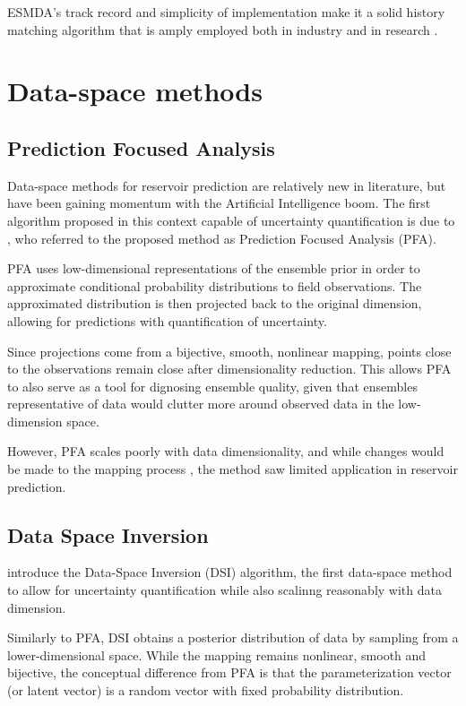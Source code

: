 ESMDA's track record and simplicity of implementation make it
a solid history matching algorithm that is 
amply employed both in industry and in research
\cite{Grana:2019, Neto:2021, Tao:2025}.

\section{Data-space methods}
\label{sec:data-space-methods} 

\subsection{Prediction Focused Analysis}
    Data-space methods for reservoir prediction are relatively new in literature, 
    but have been gaining momentum with the Artificial Intelligence boom.
    The first algorithm proposed in this context capable of uncertainty quantification
    is due to ,
    who referred to the proposed method as Prediction Focused Analysis (PFA).
    
    PFA uses low-dimensional representations of the ensemble prior in order to 
    approximate conditional probability distributions to field observations.
    The approximated distribution is then projected back to the original dimension, 
    allowing for predictions with quantification of uncertainty.
    
    Since projections come from a bijective, smooth, nonlinear mapping, 
    points close to the observations remain close after dimensionality reduction.
    This allows PFA to also serve as a tool for dignosing ensemble quality, 
    given that ensembles representative of data would clutter 
    more around observed data in the low-dimension space.   

    However, PFA scales poorly with data dimensionality,
    and while changes would be made to the mapping process
    \cite{Satija:2015, Satija:2017},
    the method saw limited application in reservoir prediction.

\subsection{Data Space Inversion}
     introduce the Data-Space Inversion (DSI) algorithm, 
    the first data-space method to allow for uncertainty quantification 
    while also scalinng reasonably with data dimension. 

    Similarly to PFA, DSI obtains a posterior distribution of data by sampling from a lower-dimensional space.
    While the mapping remains nonlinear, smooth and bijective, 
    the conceptual difference from PFA is that the parameterization vector (or latent vector)
    is a random vector with fixed probability distribution.

